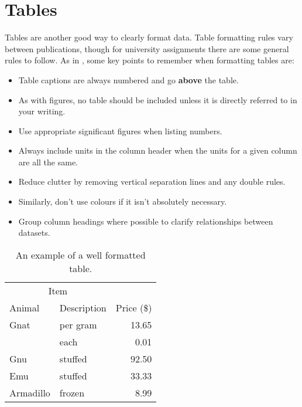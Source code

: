 \section{Tables}
Tables are another good way to clearly format data. Table formatting rules vary between publications, though for university assignments there are some general rules to follow. As in , some key points to remember when formatting tables are:
\begin{itemize}
    \item Table captions are always numbered and go \textbf{above} the table.
    \item As with figures, no table should be included unless it is directly referred to in your writing.
    \item Use appropriate significant figures when listing numbers.
    \item Always include units in the column header when the units for a given column are all the same.
    \item Reduce clutter by removing vertical separation lines and any double rules.
    \item Similarly, don't use colours if it isn't absolutely necessary.
    \item Group column headings where possible to clarify relationships between datasets.
\end{itemize}

\begin{table}
    \centering
    \caption{An example of a well formatted table.}
    \label{tab:Table}
    \begin{tabular}{@{}llr@{}} \toprule
    \multicolumn{2}{c}{Item} \\ \cmidrule(r){1-2}
    Animal & Description & Price (\$)\\ \midrule
    Gnat & per gram & 13.65 \\
    & each & 0.01 \\
    Gnu & stuffed & 92.50 \\
    Emu & stuffed & 33.33 \\
    Armadillo & frozen & 8.99 \\ \bottomrule
    \end{tabular}
\end{table}